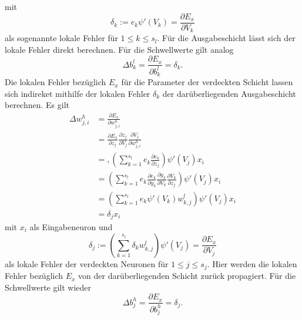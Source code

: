 mit 
\begin{equation*}
    \label{eq:delta_out}
    \delta_k:= e_k \psi'(V_k)=\frac{\partial E_x}{\partial V_k}
\end{equation*}
als sogenannte lokale Fehler für $1 \leq k \leq s_l$. Für die Ausgabeschicht lässt sich der lokale Fehler direkt berechnen.
Für die Schwellwerte gilt analog
\begin{equation*}
    \Delta b_k^l =  \frac{\partial E_x}{\partial b_{k}^l} 
                 =  \delta_k.
\end{equation*}
Die lokalen Fehler bezüglich $E_x$ für die Parameter der verdeckten Schicht lassen sich indireket mithilfe der lokalen Fehler $\delta_k$ der darüberliegenden Ausgabeschicht berechnen. Es gilt
\begin{align*}
    \Delta w_{j,i}^h &= \frac{\partial E_x}{\partial w_{j,i}^h} \\
                     &= \frac{\partial E_x}{\partial z_{j}}
                            \frac{\partial z_j}{\partial V_j} 
                            \frac{\partial V_j}{\partial w_{j,i}^h} \\
                    &= ,\left( \sum_{k=1}^{s_l} e_k \frac{\partial e_k}{\partial z_j}\right) \psi'(V_j) x_i \\
                    &= \left( \sum_{k=1}^{s_l} e_k \frac{\partial e_k}{\partial y_k} \frac{\partial y_k}{\partial V_k} \frac{\partial V_k}{\partial z_j}\right) \psi'(V_j) x_i \\
                    &= \left( \sum_{k=1}^{s_l} e_k \psi'(V_k) w_{k,j}^l \right) \psi'(V_j) x_i \\
                    &=  \delta_j x_i
\end{align*}
mit $x_i$ als Eingabeneuron und
\begin{equation}
    \label{eq:delta_hidden}
    \delta_j:= \left(\sum_{k=1}^{s_l} \delta_k w_{k,j}^l\right) \psi'(V_j)=\frac{\partial E_x}{\partial V_j}
\end{equation}
als lokale Fehler der verdeckten Neuronen für $1 \leq j \leq s_j$. Hier werden die lokalen Fehler bezüglich $E_x$ von der darüberliegenden Schicht zurück propagiert.
Für die Schwellwerte gilt wieder
\begin{equation*}
    \Delta b_j^h =  \frac{\partial E_x}{\partial b_{j}^h} 
                 =  \delta_j.
\end{equation*}

